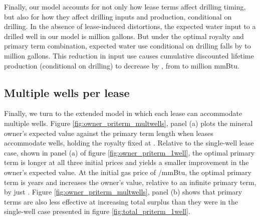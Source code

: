 \documentclass[12pt]{article}
\begin{document}
Finally, our model accounts for not only how lease terms affect drilling timing, but also for how they affect drilling inputs and production, conditional on drilling. In the absence of lease-induced distortions, the expected water input to a drilled well in our model is million gallons. But under the optimal royalty and primary term combination, expected water use conditional on drilling falls by to million gallons. This reduction in input use causes cumulative discounted lifetime production (conditional on drilling) to decrease by \unskip , from to million mmBtu.



\subsection{Multiple wells per lease}

Finally, we turn to the extended model in which each lease can accommodate multiple wells. Figure \ref{fig:owner_priterm_multwells}, panel (a) plots the mineral owner's expected value against the primary term length when leases accommodate wells, holding the royalty fixed at \unskip. Relative to the single-well lease case, shown in panel (a) of figure \ref{fig:owner_priterm_1well}, the optimal primary term is longer at all three initial prices and yields a smaller improvement in the owner's expected value. At the initial gas price of \unskip /mmBtu, the optimal primary term is years and increases the owner's value, relative to an infinite primary term, by just \unskip. Figure \ref{fig:owner_priterm_multwells}, panel (b) shows that primary terms are also less effective at increasing total surplus than they were in the single-well case presented in figure \ref{fig:total_priterm_1well}.
\end{document}
